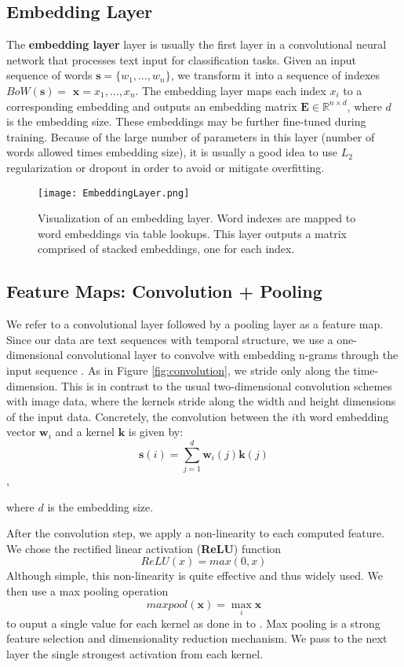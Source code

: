 \subsection{Embedding Layer}\label{embeddinglayer}
The \textbf{embedding layer} layer is usually the first layer in a convolutional neural network that processes text input for classification tasks.
Given an input sequence of words $\bm{s}=\{w_1,\dots,w_n\}$, we transform it into a sequence of indexes $BoW(\bm{s})=$ $\bm{x} = x_1,...,x_n$.
The embedding layer maps each index $x_i$ to a corresponding embedding and outputs an embedding matrix $\mathbf{E} \in \mathbb{R}^{n \times d}$, where $d$ is
the embedding size. These embeddings may be further fine-tuned during training. Because of the large number of
parameters in this layer (number of words allowed times embedding size), it is usually a good idea to
use $L_2$ regularization or dropout in order to avoid or mitigate overfitting.

\begin{figure}[H]
\centering
\texttt{[image: EmbeddingLayer.png]}
\caption{Visualization of an embedding layer. Word indexes are mapped to word embeddings via table lookups. This
layer outputs a matrix comprised of stacked embeddings, one for each index.}
\end{figure}

\subsection{Feature Maps: Convolution + Pooling}

We refer to a convolutional layer followed by a pooling layer as a feature map.
Since our data are text sequences with temporal structure, we use a one-dimensional convolutional
layer to convolve with embedding n-grams through the input sequence \cite{waibel1988phoneme}.
As in Figure \ref{fig:convolution}, we stride only along the time-dimension. This is in contrast to the usual two-dimensional convolution schemes with image data,
where the kernels stride along the width and height dimensions of the input data. Concretely, the convolution between the $i$th word embedding
vector $\bm{w}_i$ and a kernel $\bm{k}$ is given by:
\[\bm{s}(i) = \sum_{j=1}^{d}\bm{w}_i(j)\bm{k}(j)\],

where $d$ is the embedding size.

After the convolution step,
we apply a non-linearity to each computed feature. We chose the rectified linear activation (\textbf{ReLU}) function
\[ReLU(x) = max(0,x)\]
Although simple, this non-linearity is quite effective and thus widely used.
We then use a max pooling operation
\[maxpool(\bm{x}) = \max_i{ \bm{x} }\]
to ouput a single value for each kernel as done in to \cite{DBLP:journals/corr/LinCY13}.
Max pooling is a strong feature selection and dimensionality reduction mechanism.
We pass to the next layer the single strongest activation from each kernel.

